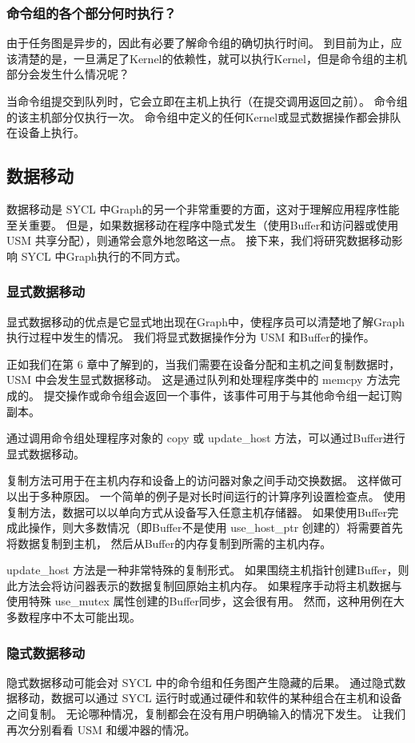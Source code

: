 \subsubsection{命令组的各个部分何时执行？}
由于任务图是异步的，因此有必要了解命令组的确切执行时间。 
到目前为止，应该清楚的是，一旦满足了Kernel的依赖性，就可以执行Kernel，但是命令组的主机部分会发生什么情况呢？

当命令组提交到队列时，它会立即在主机上执行（在提交调用返回之前）。 
命令组的该主机部分仅执行一次。 命令组中定义的任何Kernel或显式数据操作都会排队在设备上执行。

\subsection{数据移动}
数据移动是 SYCL 中Graph的另一个非常重要的方面，这对于理解应用程序性能至关重要。 
但是，如果数据移动在程序中隐式发生（使用Buffer和访问器或使用 USM 共享分配），则通常会意外地忽略这一点。 
接下来，我们将研究数据移动影响 SYCL 中Graph执行的不同方式。

\subsubsection{显式数据移动}
显式数据移动的优点是它显式地出现在Graph中，使程序员可以清楚地了解Graph执行过程中发生的情况。 
我们将显式数据操作分为 USM 和Buffer的操作。

正如我们在第 6 章中了解到的，当我们需要在设备分配和主机之间复制数据时，USM 中会发生显式数据移动。 
这是通过队列和处理程序类中的 memcpy 方法完成的。 
提交操作或命令组会返回一个事件，该事件可用于与其他命令组一起订购副本。

通过调用命令组处理程序对象的 copy 或 update\_host 方法，可以通过Buffer进行显式数据移动。

复制方法可用于在主机内存和设备上的访问器对象之间手动交换数据。 这样做可以出于多种原因。 
一个简单的例子是对长时间运行的计算序列设置检查点。 使用复制方法，数据可以以单向方式从设备写入任意主机存储器。 
如果使用Buffer完成此操作，则大多数情况（即Buffer不是使用 use\_host\_ptr 创建的）将需要首先将数据复制到主机，
然后从Buffer的内存复制到所需的主机内存。

update\_host 方法是一种非常特殊的复制形式。 
如果围绕主机指针创建Buffer，则此方法会将访问器表示的数据复制回原始主机内存。 
如果程序手动将主机数据与使用特殊 use\_mutex 属性创建的Buffer同步，这会很有用。 
然而，这种用例在大多数程序中不太可能出现。

\subsubsection{隐式数据移动}
隐式数据移动可能会对 SYCL 中的命令组和任务图产生隐藏的后果。 
通过隐式数据移动，数据可以通过 SYCL 运行时或通过硬件和软件的某种组合在主机和设备之间复制。 
无论哪种情况，复制都会在没有用户明确输入的情况下发生。 让我们再次分别看看 USM 和缓冲器的情况。

